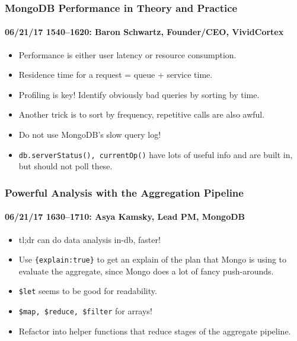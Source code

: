 \documentclass[xcolor=dvipsnames, 9pt]{beamer}
\begin{document}
\begin{frame}
    \frametitle{MongoDB Performance in Theory and Practice}
    \framesubtitle{%
        06/21/17 1540--1620:
        Baron Schwartz, Founder/CEO, VividCortex
    }

    \begin{itemize}
        \item Performance is either user latency or resource
            consumption.
        \item Residence time for a request = queue + service time.
        \item Profiling is key! Identify obviously bad queries by
            sorting by time.
        \item Another trick is to sort by frequency, repetitive calls
            are also awful.
        \item Do not use MongoDB's slow query log!
        \item \texttt{db.serverStatus(), currentOp()} have lots of
            useful info and are built in, but should not poll these.
    \end{itemize}
\end{frame}

\begin{frame}
    \frametitle{Powerful Analysis with the Aggregation Pipeline}
    \framesubtitle{%
        06/21/17 1630--1710:
        Asya Kamsky, Lead PM, MongoDB
    }

    \begin{itemize}
        \item tl;dr can do data analysis in-db, faster!
        \item Use \texttt{\{explain:true\}} to get an explain of the plan that
            Mongo is using to evaluate the aggregate, since Mongo does a lot of
            fancy push-arounds.
        \item \texttt{\$let} seems to be good for readability.
        \item \texttt{\$map, \$reduce, \$filter} for arrays!
        \item Refactor into helper functions that reduce stages of the aggregate
            pipeline.
    \end{itemize}
\end{frame}
\end{document}
